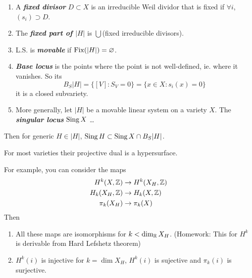 \begin{defn}\leavevmode
	\begin{enumerate}
		\item A \textbf{\textit{fixed divisor}} $D\subset X$ is an irreducible Weil dividor that is fixed if $\forall i$, $(s_i)\supset D$.
	
		\item The \textbf{\textit{fixed part of $|H|$}} is  $\bigcup$(fixed irreducible divisors).
		
		\item L.S. is \textbf{\textit{movable}} if $\operatorname{Fix}(|H|)=\varnothing$.
		
		\item \textbf{\textit{Base locus}} is the points where the point is not well-defined, ie. where it vanishes. So its \[B_S|H|=\{[V]:S_V=0\}=\{x\in X:s_i(x)=0\}\]
		it is a closed subvariety.
		
		\item More generally, let $|H|$ be a movable linear system on a variety $X$. The \textbf{\textit{singular locus}} $\operatorname{Sing} X$ …
	\end{enumerate}
\end{defn}
\begin{thm}
	Then for generic $H\in|H|$, $\operatorname{Sing} H\subset\operatorname{Sing} X\cap B_S|H|$.
\end{thm}
For most varieties their projective dual is a hypersurface.
\begin{thm}[Lefshetz]
	For example, you can consider the maps
	\begin{align*}
		H^k(X,\mathbb{Z})&\to H^k(X_H,\mathbb{Z})\\
		H_k(X_H,\mathbb{Z})&\to H_k(X,\mathbb{Z})\\
		\pi_k(X_H)&\to\pi_k(X)
	\end{align*}
	Then
	\begin{enumerate}
		\item All these maps are isomorphisms for $k<\dim_{\mathbb{R}}X_H$. {\color{magenta}(Homework: This for $H^k$ is derivable from Hard Lefshetz theorem)}
		\item $H^k(i)$ is injective for $k=\dim X_H$, $H^k(i)$ is sujective and $\pi_k(i)$ is surjective.
	\end{enumerate}
\end{thm}



